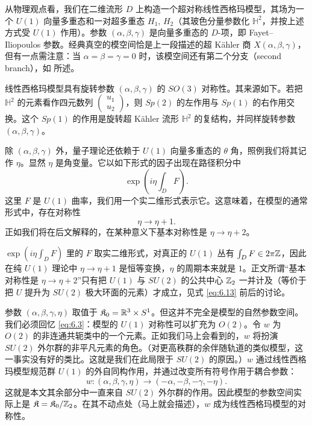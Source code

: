 {}从物理观点看，我们在二维流形 $D$ 上构造一个超对称线性西格玛模型，其场为一个 $U(1)$ 向量多重态和一对超多重态 $H_1,\, H_2$（其玻色分量参数化 $\mathbb{H}^2$，并按上述方式受 $U(1)$ 作用）。参数 $(\alpha,\beta,\gamma)$ 是向量多重态的 $D$-项，即 Fayet–Iliopoulos 参数。经典真空的模空间恰是上一段描述的超 Kähler 商 $X(\alpha,\beta,\gamma)$，但有一点需注意：当 $\alpha=\beta=\gamma=0$ 时，该模空间还有第二个分支（second branch），如 \cite{ref81} 所述。

线性西格玛模型具有旋转参数 $(\alpha,\beta,\gamma)$ 的 $SO(3)$ 对称性。其来源如下。若把 $\mathbb{H}^2$ 的元素看作四元数列 $\left(\begin{matrix}u_1\\ u_2\end{matrix}\right)$，则 $Sp(2)$ 的左作用与 $Sp(1)$ 的右作用交换。这个 $Sp(1)$ 的作用是旋转超 Kähler 流形 $\mathbb{H}^2$ 的复结构，并同样旋转参数 $(\alpha,\beta,\gamma)$。

除 $(\alpha,\beta,\gamma)$ 外，量子理论还依赖于 $U(1)$ 向量多重态的 $\theta$ 角，照例我们将其记作 $\eta$。显然 $\eta$ 是角变量。它以如下形式的因子出现在路径积分中
\setcounter{equation}{4}
\begin{equation}\label{eq:6.5}
  \exp\left(i\eta\int_DF\right).
\end{equation}
这里 $F$ 是 $U(1)$ 曲率，我们用一个实二维形式表示它。这意味着，在模型的通常形式中，存在对称性
\setcounter{equation}{5}
\begin{equation}\label{eq:6.6}
  \eta\to \eta+1.
\end{equation}
正如我们将在后文解释的，在某种意义下基本对称性是 $\eta\to\eta+2$。

\begin{yizhu}[易错点]$\exp(i\eta\int_DF)$ 里的 $F$ 取实二维形式，对真正的 $U(1)$ 丛有 $\int_DF\in 2\pi{\mathbb{Z}}$，因此在纯 $U(1)$ 理论中 $\eta\to\eta+1$ 是恒等变换，$\eta$ 的周期本来就是 $1$。正文所谓“基本对称性是 $\eta\to\eta+2$”只有把 $U(1)$ 与 $SU(2)$ 的公共中心 ${\mathbb{Z}}_2$ 一并计及（等价于把 $U$ 提升为 $SU(2)$ 极大环面的元素）才成立，见式 \eqref{eq:6.13} 前后的讨论。\end{yizhu}


参数 $(\alpha,\beta,\gamma,\eta)$ 取值于 $\mathfrak{K}_0={\mathbb{R}}^3\times S^1$。但这并不完全是模型的自然参数空间。我们必须回忆 \eqref{eq:6.3}：模型的 $U(1)$ 对称性可以扩充为 $O(2)$。令 $w$ 为 $O(2)$ 的非连通共轭类中的一个元素。正如我们马上会看到的，$w$ 将扮演 $SU(2)$ 外尔群的非平凡元素的角色。（对更高秩群的余伴随轨道的类似模型，这一事实没有好的类比。这就是我们在此局限于 $SU(2)$ 的原因。）$w$ 通过线性西格玛模型规范群 $U(1)$ 的外自同构作用，并通过改变所有符号作用于耦合参数：
\setcounter{equation}{6}
\begin{equation}\label{eq:6.7}
  w:(\alpha,\beta,\gamma,\eta)\to
(-\alpha,-\beta,-\gamma,-\eta).
\end{equation}
 这就是本文其余部分中一直来自 $SU(2)$ 外尔群的作用。因此模型的参数空间实际上是 $\mathfrak{K}=\mathfrak{K}_0/{\mathbb{Z}}_2$。在其不动点处（马上就会描述），$w$ 成为线性西格玛模型的对称性。


